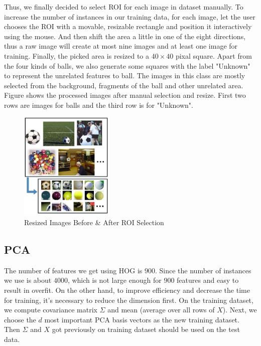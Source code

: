 \documentclass{article}
\begin{document}
Thus, we finally decided to select ROI for each image in dataset manually. To increase the number of instances in our training data, for each image, let the user chooses the ROI with a movable, resizable rectangle and position it interactively using the mouse. And then shift the area a little in one of the eight directions, thus a raw image will create at most nine images and at least one image for training. Finally, the picked area is resized to a $40 \times 40$ pixal square. Apart from the four kinds of balls, we also generate some squares with the label "Unknown" to represent the unrelated features to ball. The images in this class are mostly selected from the background, fragments of the ball and other unrelated area. Figure \cite{ROIResult} shows the processed images after manual selection and resize. First two rows are images for balls and the third row is for "Unknown".
\begin{figure}[htp]
\centering
\includegraphics[width=0.4\textwidth]{ROISelection.jpg}
\caption{Resized Images Before \& After ROI Selection}
\label{fig:ROIResult}
\end{figure}

\subsection{PCA}
The number of features we get using HOG is $900$. Since the number of instances we use is about $4000$, which is not large enough for $900$ features and easy to result in overfit. On the other hand, to improve efficiency and decrease the time for training, it's necessary to reduce the dimension first. On the training dataset, we compute covariance matrix $\Sigma$ and mean (average over all rows of $X$). Next, we choose the $d$ most important PCA basis vectors as the new training dataset. Then $\Sigma$ and $X$ got previously on training dataset should be used on the test data.
\end{document}
